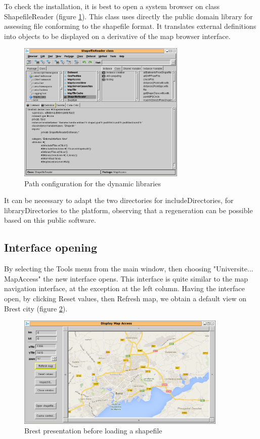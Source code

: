 To check the installation, it is best to open a system browser on class 
ShapefileReader (figure \ref{fig:configBrowserShp}). 
This class uses directly the public domain library 
for assessing file conforming to the shapefile format. 
It translates external definitions into objects to be displayed 
on a derivative of the map browser interface. 

\begin{figure}
\begin{center}
\includegraphics[width=8cm]{config-browser-shp.png}
\caption{Path configuration for the dynamic libraries}
\label{fig:configBrowserShp}
\end{center}
\end{figure}

It can be necessary to adapt the two directories for includeDirectories, 
for libraryDirectories to the platform, observing that a regeneration can be 
possible based on this public software. 


\subsection{Interface opening}
By selecting the Tools menu from the main window, then choosing "Universite... MapAccess"
the new interface opens. This interface is quite similar to the map navigation interface, at 
the exception at the left column. Having the interface open, by clicking 
Reset values, then Refresh map, we obtain a default view on Brest city 
(figure \ref{fig:mapAccessMainWindow}). 

\begin{figure}
\begin{center}
\includegraphics[width=10cm]{mapAccessWindow.png}
\caption{Brest presentation before loading a shapefile}
\label{fig:mapAccessMainWindow}
\end{center}
\end{figure}

